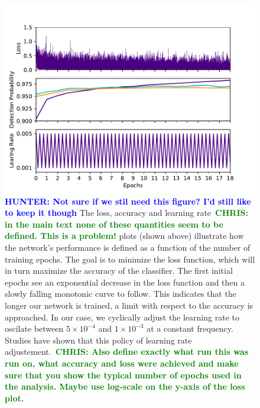 \documentclass[%
showpacs,
 amsmath,amssymb,
 aps,
 twocolumn,
 prl,
 reprint,
floatfix,
]{revtex4-1}
\newcommand{\chris}[1]{\textbf{\textcolor{green}{CHRIS: #1}}}
\newcommand{\hunter}[1]{\textbf{\textcolor{blue}{HUNTER: #1}}}
\begin{document}
\begin{figure} 
\includegraphics[width=\columnwidth]{figures/loss.pdf}
\caption{\label{fig:loss_curve} \hunter{Not sure if we stil need this figure? I'd still like to keep it though} The
loss, accuracy and learning rate~\chris{in the main text none of these
quantities seem to be defined. This is a problem!} plots (shown above)
illustrate how the network's performance is defined as a function of the number
of training epochs. The goal is
to minimize the loss function, which will in turn maximize the accuracy of the
classifier. The first initial epochs see an exponential decrease in the loss
function and then a slowly falling monotonic curve to follow. This indicates
that the longer our network is trained, a limit with respect to the accuracy is
approached. In our case, we cyclically adjust the learning rate to oscilate
between $5 \times 10^{-4}$ and $1 \times 10^{-3}$ at a constant frequency.
Studies have shown that this policy of learning rate adjustement.~\chris{Also
define exactly what run this was run on, what accuracy and loss were achieved
and make sure that you show the typical number of epochs used in the analysis.
Maybe use log-scale on the y-axis of the loss plot.}} 
\end{figure}
\end{document}
